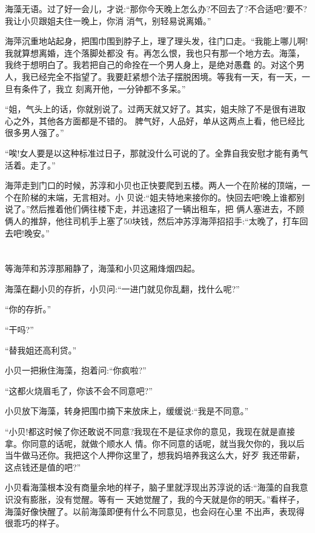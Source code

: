 \documentclass[11pt,a4paper,onecolumn]{article}
\begin{document}
海藻无语。过了好一会儿，才说:``那你今天晚上怎么办?不回去了?不合适吧?要不?我让小贝跟姐夫住一晚上，你消
消气，别轻易说离婚。''

海萍沉重地站起身，把围巾围到脖子上，理了理头发，往门口走。``我能上哪儿啊!我就算想离婚，连个落脚处都没
有。再怎么恨，我也只有那一个地方去。海藻，我终于想明白了。我若把自己的命拴在一个男人身上，是绝对愚蠢
的。对这个男人，我已经完全不指望了。我要赶紧想个法子摆脱困境。等我有一天，有一天，一旦有条件了，我立
刻离开他，一分钟都不多呆。''

``姐，气头上的话，你就别说了。过两天就又好了。其实，姐夫除了不是很有进取心之外，其他各方面都是不错的。
脾气好，人品好，单从这两点上看，他已经比很多男人强了。''

``唉!女人要是以这种标准过日子，那就没什么可说的了。全靠自我安慰才能有勇气活着。走了。''

海萍走到门口的时候，苏淳和小贝也正快要爬到五楼。两人一个在阶梯的顶端，一个在阶梯的末端，无言相对。小
贝说:``姐夫特地来接你的。快回去吧!晚上谁都别说了。''然后推着他们俩往楼下走，并迅速招了一辆出租车，把
俩人塞进去，不顾俩人的推辞，他往司机手上塞了50块钱，然后冲苏淳海萍招招手:``太晚了，打车回去吧!晚安。''

\section[\thesection]{}

等海萍和苏淳那厢静了，海藻和小贝这厢烽烟四起。

海藻在翻小贝的存折，小贝问:``一进门就见你乱翻，找什么呢?''

``你的存折。''

``干吗?''

``替我姐还高利贷。''

小贝一把揪住海藻，抱着问:``你疯啦?''

``这都火烧眉毛了，你该不会不同意吧?''

小贝放下海藻，转身把围巾摘下来放床上，缓缓说:``我是不同意。''

``小贝!都这时候了你还敢说不同意?我现在不是征求你的意见，我现在就是直接拿。你同意的话呢，就做个顺水人
情。你不同意的话呢，就当我欠你的，我以后当牛做马还你。我把这个人押你这里了，想我妈培养我这么大，好歹
我还带薪，这点钱还是值的吧?''

小贝看海藻根本没有商量余地的样子，脑子里就浮现出苏淳说的话:``海藻的自我意识没有膨胀，没有觉醒。等有一
天她觉醒了，我的今天就是你的明天。''看样子，海藻好像快醒了。以前海藻即便有什么不同意见，也会闷在心里
不出声，表现得很乖巧的样子。
\end{document}
